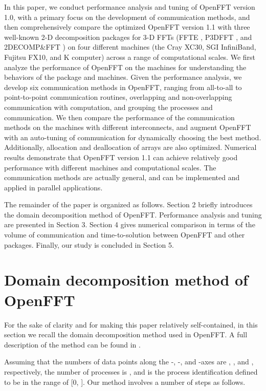 In this paper, we conduct performance analysis and tuning of OpenFFT version 1.0, with a primary focus on the development of communication methods, and then comprehensively compare the optimized OpenFFT version 1.1 with three well-known 2-D decomposition packages for 3-D FFTs (FFTE \cite{takahashi2010implementation,ffte}, P3DFFT \cite{doi:10.1137/11082748X,p3dfft}, and 2DECOMP\&FFT \cite{Li2010,2DECOMP}) on four different machines (the Cray XC30, SGI InfiniBand, Fujitsu FX10, and K computer) across a range of computational scales. We first analyze the performance of OpenFFT on the machines for understanding the behaviors of the package and machines. Given the performance analysis, we develop six communication methods in OpenFFT, ranging from all-to-all to point-to-point communication routines, overlapping and non-overlapping communication with computation, and grouping the processes and communication. We then compare the performance of the communication methods on the machines with different interconnects, and augment OpenFFT with an auto-tuning of communication for dynamically choosing the best method. Additionally, allocation and deallocation of arrays are also optimized. Numerical results demonstrate that OpenFFT version 1.1 can achieve relatively good performance with different machines and computational scales. The communication methods are actually general, and can be implemented and applied in parallel applications.

The remainder of the paper is organized as follows. Section 2 briefly introduces the domain decomposition method of OpenFFT. Performance analysis and tuning are presented in Section 3. Section 4 gives numerical comparison in terms of the volume of communication and time-to-solution between OpenFFT and other packages. Finally, our study is concluded in Section 5. 


\section{Domain decomposition method of OpenFFT}
\label{Methods}

For the sake of clarity and for making this paper relatively self-contained, in this section we recall the domain decomposition method used in OpenFFT. A full description of the method can be found in \cite{Duy2014153}. 

Assuming that the numbers of data points along the -, -, and -axes are , , and , respectively, the number of processes is , and  is the process identification defined to be in the range of [0, ]. Our method involves a number of steps as follows. 

